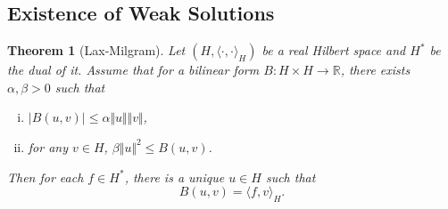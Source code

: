 \documentclass{article}
\newtheorem{theorem}{Theorem}[section]
\numberwithin{equation}{section}
\begin{document}
\subsection{Existence of Weak Solutions}

\begin{theorem}[Lax-Milgram]
\label{LM}
Let $(H,\langle\cdot,\cdot\rangle_H)$ be a real Hilbert space and $H^*$ be the dual of it. Assume that for a bilinear form $B:H\times H\to\mathbb{R}$, there exists $\alpha,\beta>0$ such that
\begin{enumerate}[i).]
\item $\vert B(u,v)\vert\leq \alpha\Vert u\Vert\Vert v\Vert$,
\item for any $v\in H$, $\beta\Vert u\Vert^2\leq B(u,v)$.
\end{enumerate}
Then for each $f\in H^*$, there is a unique $u\in H$ such that
\begin{equation*}
B(u,v) = \langle f,v\rangle_H.
\end{equation*}
\end{theorem}
\end{document}
